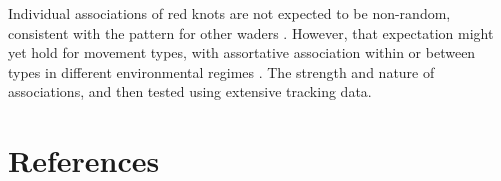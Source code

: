 Individual associations of red knots are not expected to be non-random,
consistent with the pattern for other waders
\citep{myers1983, conklin2008}. However, that expectation might yet hold
for movement types, with assortative association within or between types
in different environmental regimes \citep{spiegel2017}. The strength and
nature of associations, and then tested using extensive tracking data. 

\nolinenumbers

\newpage

 

\part{References}
\footnotesize
\changemargin{-1.0cm}{-1.0cm}




